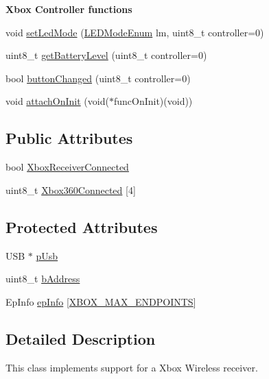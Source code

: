 \begin{Indent}{\bf \-Xbox \-Controller functions}
\begin{DoxyCompactItemize}
\item 
void \hyperlink{class_x_b_o_x_r_e_c_v_a4f4bf40c7ab250c75b7d719c6464fca1}{set\-Led\-Mode} (\hyperlink{xbox_enums_8h_abb8a1831f62ea139a2255c67bb24330f}{\-L\-E\-D\-Mode\-Enum} lm, uint8\-\_\-t controller=0)
\item 
uint8\-\_\-t \hyperlink{class_x_b_o_x_r_e_c_v_aaa7a0d0861b8303a4b1654684d185b4f}{get\-Battery\-Level} (uint8\-\_\-t controller=0)
\item 
bool \hyperlink{class_x_b_o_x_r_e_c_v_ae78ddfff307d26b0ed35dfb75173adf7}{button\-Changed} (uint8\-\_\-t controller=0)
\item 
void \hyperlink{class_x_b_o_x_r_e_c_v_ababaa2f28de8bf6749fe649b4e93c583}{attach\-On\-Init} (void($\ast$func\-On\-Init)(void))
\end{DoxyCompactItemize}
\end{Indent}
\subsection*{\-Public \-Attributes}
\begin{DoxyCompactItemize}
\item 
bool \hyperlink{class_x_b_o_x_r_e_c_v_a5ff16bba78f05af3023f395a342b625c}{\-Xbox\-Receiver\-Connected}
\item 
uint8\-\_\-t \hyperlink{class_x_b_o_x_r_e_c_v_ac07faada38e159f1e7831d90863ebe3a}{\-Xbox360\-Connected} \mbox{[}4\mbox{]}
\end{DoxyCompactItemize}
\subsection*{\-Protected \-Attributes}
\begin{DoxyCompactItemize}
\item 
\-U\-S\-B $\ast$ \hyperlink{class_x_b_o_x_r_e_c_v_a53047c86c8c2f625916af62238d50fc8}{p\-Usb}
\item 
uint8\-\_\-t \hyperlink{class_x_b_o_x_r_e_c_v_a1d4bdb1b740c87fd51aca3969e67c730}{b\-Address}
\item 
\-Ep\-Info \hyperlink{class_x_b_o_x_r_e_c_v_af97c8d0efc945fa4ba1d120c8a5a9cbb}{ep\-Info} \mbox{[}\hyperlink{_x_b_o_x_u_s_b_8h_af35f872fc33e690571eb99de648e8e96}{\-X\-B\-O\-X\-\_\-\-M\-A\-X\-\_\-\-E\-N\-D\-P\-O\-I\-N\-T\-S}\mbox{]}
\end{DoxyCompactItemize}


\subsection{\-Detailed \-Description}
\-This class implements support for a \-Xbox \-Wireless receiver.

